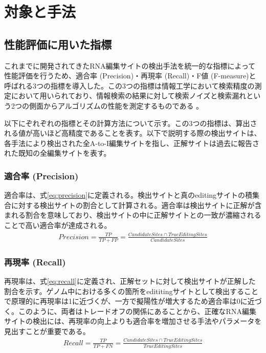 \section{対象と手法}
\subsection{性能評価に用いた指標}
これまでに開発されてきたRNA編集サイトの検出手法を統一的な指標によって性能評価を行うため、適合率 (Precision)・再現率 (Recall)・F値 (F-measure)と呼ばれる3つの指標を導入した。この3つの指標は情報工学において検索精度の測定において用いられており、情報検索の結果に対して検索ノイズと検索漏れという2つの側面からアルゴリズムの性能を測定するものである \citep{davis2006relationship}。
\par
以下にぞれぞれの指標とその計算方法について示す。この3つの指標は、算出される値が高いほど高精度であることを表す。以下で説明する際の検出サイトは、各手法により検出された全A-to-I編集サイトを指し、正解サイトは過去に報告された既知の全編集サイトを表す。

\subsubsection{適合率 (Precision)}
適合率は、式\ref{eq:precision}に定義される。検出サイトと真のeditingサイトの積集合に対する検出サイトの割合として計算される。適合率は検出サイトに正解が含まれる割合を意味しており、検出サイトの中に正解サイトとの一致が濃縮されることで高い適合率が達成される。
\begin{eqnarray}
	Precision = \frac{TP}{TP + FP} = \frac{CandidateSites \cap TrueEditingSites}{CandidateSites}
	\label{eq:precision}
\end{eqnarray}

\subsubsection{再現率 (Recall)}
再現率は、式\ref{eq:recall}に定義され、正解セットに対して検出サイトが正解した割合を示す。ゲノム中における多くの箇所をedititingサイトとして検出することで原理的に再現率は1に近づくが、一方で擬陽性が増大するため適合率は0に近づく。このように、両者はトレードオフの関係にあることから、正確なRNA編集サイトの検出には、再現率の向上よりも適合率を増加させる手法やパラメータを見出すことが重要である。
\begin{eqnarray}
	Recall = \frac{TP}{TP+FN}
	= \frac{CandidateSites \cap TrueEditingSites}{TrueEditingSites}
	\label{eq:recall}
\end{eqnarray}

